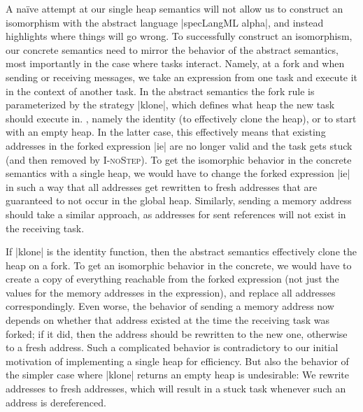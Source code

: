 A na\"ive attempt at our single heap semantics
will not allow us to construct an isomorphism
with the abstract language |specLangML alpha|, and instead highlights
where things will go wrong.
To successfully construct an isomorphism, our concrete semantics need
to mirror the behavior of the abstract semantics, most importantly
in the case where tasks interact.  Namely, at a fork and when sending
or receiving messages, we take an expression from one task and
execute it in the context of another task.  In the abstract semantics
the fork rule is parameterized by the strategy |klone|, which defines
what heap the new task should execute in.  , namely the identity (to effectively
clone the heap), or to start with an empty heap.
In the latter case, this effectively means that existing addresses
in the forked expression |ie| are no longer valid and the
task gets stuck (and then removed by \textsc{I-noStep}).
To get the isomorphic behavior in the concrete semantics with a
single heap, we would have to change the forked expression |ie| in
such a way that all addresses get rewritten to fresh addresses
that are guaranteed to not occur in the global heap.  Similarly,
sending a memory address should take a similar approach, as addresses
for sent references will not exist in the receiving task.

If |klone| is the identity function, then the abstract semantics
effectively clone the heap on a fork.  To get an isomorphic
behavior in the concrete, we would have to create a copy of everything
reachable from the forked expression (not just the values for
the memory addresses in the expression), and replace all addresses
correspondingly.  Even worse, the behavior of sending a memory address
now depends on whether that address existed at the time the receiving
task was forked;  if it did, then the address should be rewritten to the
new one, otherwise to a fresh address.
Such a complicated behavior is contradictory to our initial motivation
of implementing a single heap for efficiency.  But also the
behavior of the simpler case where |klone| returns an empty heap is
undesirable:  We rewrite addresses to fresh addresses, which will
result in a stuck task whenever such an address is dereferenced.

